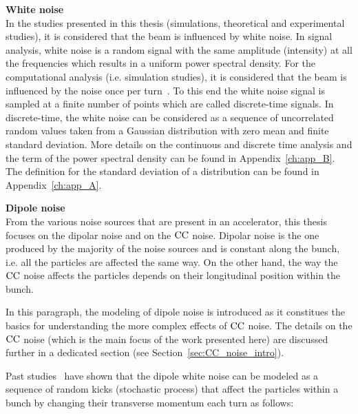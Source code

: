 \textbf{White noise}\\
In the studies presented in this thesis (simulations, theoretical and experimental studies), it is considered that the beam is influenced by white noise. In signal analysis, white noise is a random signal with the same amplitude (intensity) at all the frequencies which results in a uniform power spectral density. For the computational analysis (i.e. simulation studies), it is considered that the beam is influenced by the noise once per turn~\cite{Lebedev:248620, Lebedev:248622, PhysRevSTAB.18.101001}. To this end the white noise signal is sampled at a finite number of points which are called discrete-time signals. In discrete-time, the white noise can be considered as a sequence of uncorrelated random values taken from a Gaussian distribution with zero mean and finite standard deviation. More details on the continuous and discrete time analysis and the term of the power spectral density can be found in Appendix~\ref{ch:app_B}. The definition for the standard deviation of a distribution can be found in Appendix~\ref{ch:app_A}.



\textbf{Dipole noise}\\
From the various noise sources that are present in an accelerator, this thesis focuses on the dipolar noise and on the ${\mathrm{CC}}$ noise. Dipolar noise is the one produced by the majority of the noise sources and is constant along the bunch, i.e. all the particles are affected the same way. %
On the other hand, the way the ${\mathrm{CC}}$ noise affects the particles depends on their longitudinal position within the bunch. 

In this paragraph, the modeling of dipole noise is introduced as it constitues the basics for understanding the more complex effects of ${\mathrm{CC}}$ noise. The details on the ${\mathrm{CC}}$ noise (which is the main focus of the work presented here) are discussed further in a dedicated section (see Section~\ref{sec:CC_noise_intro}). 

Past studies~\cite{Lebedev:248620, Lebedev:248622} have shown that the dipole white noise can be modeled as a sequence of random kicks (stochastic process) that affect the particles within a bunch by changing their transverse momentum each turn as follows:

